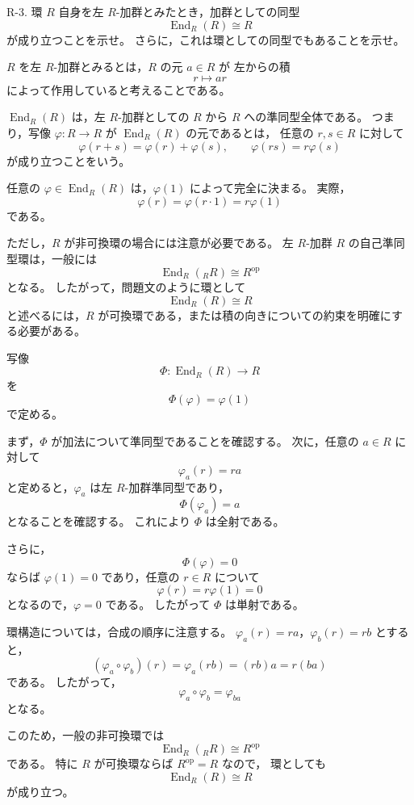 
\begin{exercise}
	R-3. 環 $R$ 自身を左 $R$-加群とみたとき，加群としての同型
	\[
	\operatorname{End}_R(R)\cong R
	\]
	が成り立つことを示せ。
	さらに，これは環としての同型でもあることを示せ。
\end{exercise}

\begin{background}
	$R$ を左 $R$-加群とみるとは，$R$ の元 $a\in R$ が
	左からの積
	\[
	r\mapsto ar
	\]
	によって作用していると考えることである。
	
	$\operatorname{End}_R(R)$ は，左 $R$-加群としての
	$R$ から $R$ への準同型全体である。
	つまり，写像 $\varphi:R\to R$ が $\operatorname{End}_R(R)$ の元であるとは，
	任意の $r,s\in R$ に対して
	\[
	\varphi(r+s)=\varphi(r)+\varphi(s),
	\qquad
	\varphi(rs)=r\varphi(s)
	\]
	が成り立つことをいう。
	
	任意の $\varphi\in\operatorname{End}_R(R)$ は，$\varphi(1)$ によって完全に決まる。
	実際，
	\[
	\varphi(r)=\varphi(r\cdot 1)=r\varphi(1)
	\]
	である。
	
	ただし，$R$ が非可換環の場合には注意が必要である。
	左 $R$-加群 $R$ の自己準同型環は，一般には
	\[
	\operatorname{End}_R({}_RR)\cong R^{\operatorname{op}}
	\]
	となる。
	したがって，問題文のように環として
	\[
	\operatorname{End}_R(R)\cong R
	\]
	と述べるには，$R$ が可換環である，または積の向きについての約束を明確にする必要がある。
\end{background}

\begin{strategy}
	写像
	\[
	\Phi:\operatorname{End}_R(R)\longrightarrow R
	\]
	を
	\[
	\Phi(\varphi)=\varphi(1)
	\]
	で定める。
	
	まず，$\Phi$ が加法について準同型であることを確認する。
	次に，任意の $a\in R$ に対して
	\[
	\varphi_a(r)=ra
	\]
	と定めると，$\varphi_a$ は左 $R$-加群準同型であり，
	\[
	\Phi(\varphi_a)=a
	\]
	となることを確認する。
	これにより $\Phi$ は全射である。
	
	さらに，
	\[
	\Phi(\varphi)=0
	\]
	ならば $\varphi(1)=0$ であり，任意の $r\in R$ について
	\[
	\varphi(r)=r\varphi(1)=0
	\]
	となるので，$\varphi=0$ である。
	したがって $\Phi$ は単射である。
	
	環構造については，合成の順序に注意する。
	$\varphi_a(r)=ra$，$\varphi_b(r)=rb$ とすると，
	\[
	(\varphi_a\circ\varphi_b)(r)
	=
	\varphi_a(rb)
	=
	(rb)a
	=
	r(ba)
	\]
	である。
	したがって，
	\[
	\varphi_a\circ\varphi_b=\varphi_{ba}
	\]
	となる。
	
	このため，一般の非可換環では
	\[
	\operatorname{End}_R({}_RR)\cong R^{\operatorname{op}}
	\]
	である。
	特に $R$ が可換環ならば $R^{\operatorname{op}}=R$ なので，
	環としても
	\[
	\operatorname{End}_R(R)\cong R
	\]
	が成り立つ。
\end{strategy}